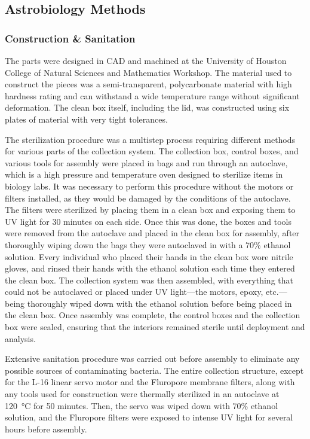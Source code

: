 \subsection{Astrobiology Methods}
\label{sec:Astrobiology-Methods}

\subsubsection{Construction \& Sanitation}
\label{sec:Construction and Sanitation}
The parts were designed in CAD and machined at the University of Houston College of Natural Sciences and Mathematics Workshop. The material used to construct the pieces was a semi-transparent, polycarbonate material with high hardness rating and can withstand a wide temperature range without significant deformation. The clean box itself, including the lid, was constructed using six plates of material with very tight tolerances. 

The sterilization procedure was a multistep process requiring different methods for various parts of the
collection system. The collection box, control boxes, and various tools for assembly were placed in bags
and run through an autoclave, which is a high pressure and temperature oven designed to sterilize items in
biology labs. It was necessary to perform this procedure without the motors or filters installed, as they
would be damaged by the conditions of the autoclave. The filters were sterilized by placing them in a
clean box and exposing them to UV light for 30 minutes on each side. Once this was done, the boxes and
tools were removed from the autoclave and placed in the clean box for assembly, after thoroughly wiping
down the bags they were autoclaved in with a 70\% ethanol solution. Every individual who placed their
hands in the clean box wore nitrile gloves, and rinsed their hands with the ethanol solution each time they
entered the clean box. The collection system was then assembled, with everything that could not be
autoclaved or placed under UV light—the motors, epoxy, etc.—being thoroughly wiped down with the
ethanol solution before being placed in the clean box. Once assembly was complete, the control boxes and
the collection box were sealed, ensuring that the interiors remained sterile until deployment and analysis.

Extensive sanitation procedure was carried out before assembly to eliminate any possible sources of contaminating bacteria. The entire collection structure, except for the L-16 linear servo motor and the Fluropore membrane filters, along with any tools used for construction were thermally sterilized in an autoclave at \SI{120}{\celsius} for 50 minutes. Then, the servo was wiped down with 70\% ethanol solution, and the Fluropore filters were exposed to intense UV light for several hours before assembly.

